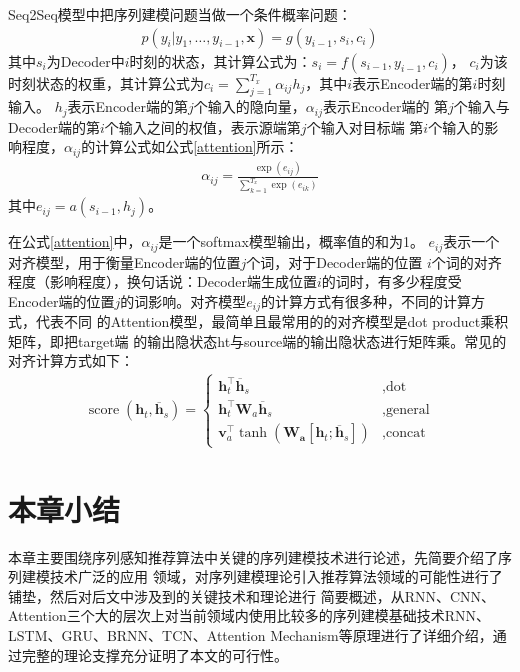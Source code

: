 Seq2Seq模型中把序列建模问题当做一个条件概率问题：
\begin{align}
  p\left(y_{i} | y_{1}, \ldots, y_{i-1}, \mathbf{x}\right)=g\left(y_{i-1}, s_{i}, c_{i}\right)
\end{align}
其中$s_{i}$为Decoder中$i$时刻的状态，其计算公式为：$s_{i}=f\left(s_{i-1}, y_{i-1}, c_{i}\right)$，
$c_{i}$为该时刻状态的权重，其计算公式为$c_{i}=\sum_{j=1}^{T_{x}} \alpha_{ij} h_{j}$，其中$i$表示Encoder端的第$i$时刻输入。
$h_{j}$表示Encoder端的第$j$个输入的隐向量，$\alpha_{i j}$表示Encoder端的%
第$j$个输入与Decoder端的第$i$个输入之间的权值，表示源端第$j$个输入对目标端%
第$i$个输入的影响程度，$\alpha_{i j}$的计算公式如公式\eqref{attention}所示：
\begin{align}
  \alpha_{i j}=\frac{\exp \left(e_{i j}\right)}{\sum_{k=1}^{T_{x}} \exp \left(e_{i k}\right)} \label{attention}
\end{align} 
其中$e_{i j}=a\left(s_{i-1}, h_{j}\right)$。

在公式\eqref{attention}中，$\alpha_{ij}$是一个softmax模型输出，概率值的和为1。%
$e_{ij}$表示一个对齐模型，用于衡量Encoder端的位置$j$个词，对于Decoder端的位置%
$i$个词的对齐程度（影响程度），换句话说：Decoder端生成位置$i$的词时，有多少程度受%
Encoder端的位置$j$的词影响。对齐模型$e_{ij}$的计算方式有很多种，不同的计算方式，代表不同%
的Attention模型，最简单且最常用的的对齐模型是dot product乘积矩阵，即把target端%
的输出隐状态ht与source端的输出隐状态进行矩阵乘。常见的对齐计算方式如下：
\begin{align}
\operatorname{score}\left(\boldsymbol{h}_{t}, \overline{\boldsymbol{h}}_{s}\right)=
\left\{
  \begin{array}{ll}{\boldsymbol{h}_{t}^{\top} \overline{\boldsymbol{h}}_{s}} &, {\text {dot}} \\ {\boldsymbol{h}_{t}^{\top} \boldsymbol{W}_{a} \overline{\boldsymbol{h}}_{s}} &, {\text {general}} \\ {\boldsymbol{v}_{a}^{\top} \tanh \left(\boldsymbol{W}_{\boldsymbol{a}}\left[\boldsymbol{h}_{t} ; \overline{\boldsymbol{h}}_{s}\right]\right)} &, {\text {concat}}
  \end{array}
\right.
\end{align} 

\section{本章小结}

本章主要围绕序列感知推荐算法中关键的序列建模技术进行论述，先简要介绍了序列建模技术广泛的应用%
领域，对序列建模理论引入推荐算法领域的可能性进行了铺垫，然后对后文中涉及到的关键技术和理论进行%
简要概述，从RNN、CNN、Attention三个大的层次上对当前领域内使用比较多的序列建模基础技术RNN、LSTM、GRU、BRNN、TCN、Attention Mechanism等原理进行了详细介绍，通过完整的理论支撑充分证明了本文的可行性。
